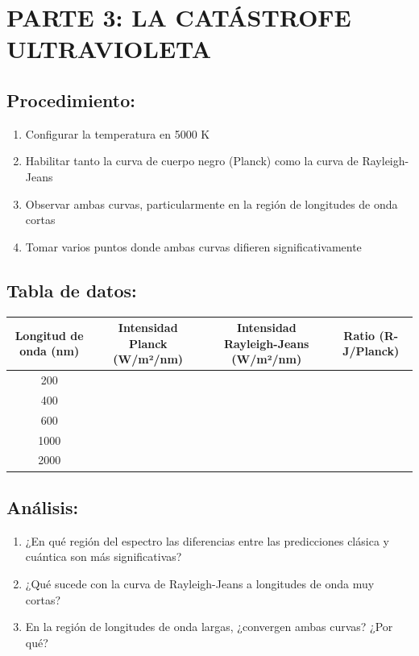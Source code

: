\documentclass[12pt,a4paper]{article}
\begin{document}
	\newpage
	
	\section{PARTE 3: LA CATÁSTROFE ULTRAVIOLETA}
	
	\subsection{Procedimiento:}
	\begin{enumerate}
		\item Configurar la temperatura en 5000 K
		\item Habilitar tanto la curva de cuerpo negro (Planck) como la curva de Rayleigh-Jeans
		\item Observar ambas curvas, particularmente en la región de longitudes de onda cortas
		\item Tomar varios puntos donde ambas curvas difieren significativamente
	\end{enumerate}
	
	\subsection{Tabla de datos:}
	
	\begin{center}
		\begin{tabular}{|c|c|c|c|}
			\hline
			\textbf{Longitud de onda (nm)} & \textbf{Intensidad Planck (W/m²/nm)} & \textbf{Intensidad Rayleigh-Jeans (W/m²/nm)} & \textbf{Ratio (R-J/Planck)} \\
			\hline
			200 & & & \\
			\hline
			400 & & & \\
			\hline
			600 & & & \\
			\hline
			1000 & & & \\
			\hline
			2000 & & & \\
			\hline
		\end{tabular}
	\end{center}
	
	\subsection{Análisis:}
	\begin{enumerate}
		\item ¿En qué región del espectro las diferencias entre las predicciones clásica y cuántica son más significativas?
		\item ¿Qué sucede con la curva de Rayleigh-Jeans a longitudes de onda muy cortas?
		\item En la región de longitudes de onda largas, ¿convergen ambas curvas? ¿Por qué?
	\end{enumerate}
	
\end{document}

